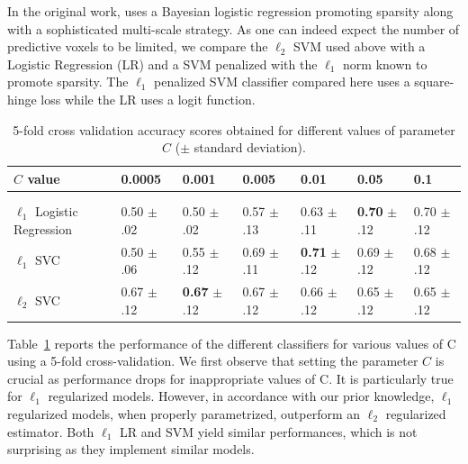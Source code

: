 \documentclass{frontiersSCNS} %
\begin{document}
In the original work, \cite{miyawaki2008} uses a Bayesian logistic regression
promoting sparsity along with a sophisticated multi-scale strategy.
As one can indeed expect the number of predictive voxels to be limited, we 
compare the $\ell_2$ SVM used above with
a Logistic Regression (LR) and a SVM
penalized with the $\ell_1$ norm
known to promote sparsity. The $\ell_1$ penalized SVM classifier compared here
uses a square-hinge loss while the LR uses a logit function.


\begin{table}[htbp]
    \begin{center}
    \begin{tabular}{l|llllll}
        $C$ value           & 0.0005 & 0.001  & 0.005  & 0.01   & 0.05    & 0.1    \\
    \hline\\[-.9em]
    \hline\\[-.7em]
        $\ell_1$ Logistic Regression & 0.50 $\pm$ .02
                                     & 0.50 $\pm$ .02 
                                     & 0.57 $\pm$ .13
                                     & 0.63 $\pm$ .11
                                     & \textbf{0.70} $\pm$ .12
                                     & 0.70 $\pm$ .12 \\[.1em]
        $\ell_1$ SVC        & 0.50 $\pm$ .06
                            & 0.55 $\pm$ .12
                            & 0.69 $\pm$ .11
                            & \textbf{0.71} $\pm$ .12
                            & 0.69 $\pm$ .12
                            & 0.68 $\pm$ .12 \\[.1em]
        $\ell_2$ SVC        & 0.67 $\pm$ .12
                            & \textbf{0.67} $\pm$ .12
                            & 0.67 $\pm$ .12
                            & 0.66 $\pm$ .12
                            & 0.65 $\pm$ .12
                            & 0.65 $\pm$ .12
    \end{tabular}
    \end{center}
    \caption{5-fold cross validation accuracy scores obtained for different
    values of parameter $C$ ($\pm$ standard deviation).}
    \label{fig:miyawaki_cv}
\end{table}

Table~\ref{fig:miyawaki_cv} reports the performance of the different classifiers
for various values of C using a 5-fold cross-validation.
We first observe that setting the parameter $C$ is
crucial as performance drops for inappropriate values of C. It is particularly
true for $\ell_1$ regularized models. However,
in accordance with our prior knowledge, $\ell_1$
regularized models, when properly
parametrized, outperform an $\ell_2$ regularized estimator.
Both $\ell_1$ LR and SVM yield similar performances,
which is not surprising as they implement similar models.
\end{document}
